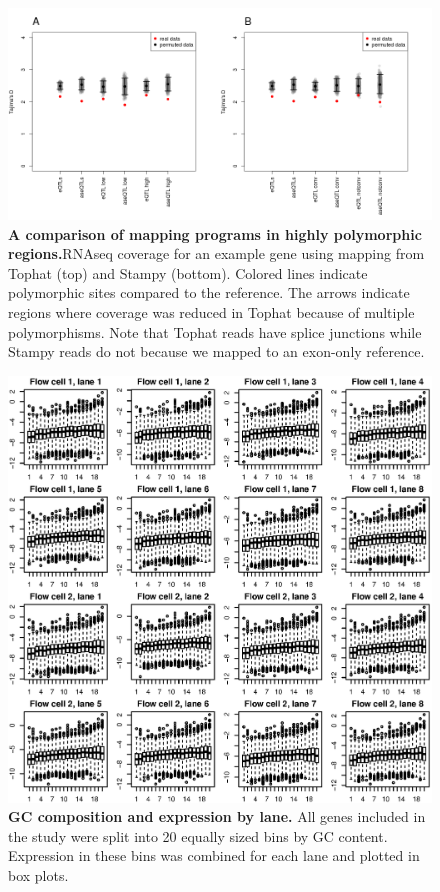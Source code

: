 \begin{figure}[h!]
      \centering
       \includegraphics[width=\linewidth]{Ch3FigS6}
    \caption{\textbf{A comparison of mapping programs in highly polymorphic regions.}RNAseq coverage for an example gene using mapping from Tophat (top) and Stampy (bottom). Colored lines indicate polymorphic sites compared to the reference. The arrows indicate regions where coverage was reduced in Tophat because of multiple polymorphisms. Note that Tophat reads have splice junctions while Stampy reads do not because we mapped to an exon-only reference.}
    \label{fig:3figS6}
\end{figure}

\begin{figure}[h!]
      \centering
       \includegraphics[width=\linewidth]{Ch3FigS7}
    \caption{\textbf{GC composition and expression by lane.} All genes included in the study were split into 20 equally sized bins by GC content. Expression in these bins was combined for each lane and plotted in box plots.}
    \label{fig:3figS7}
\end{figure}

